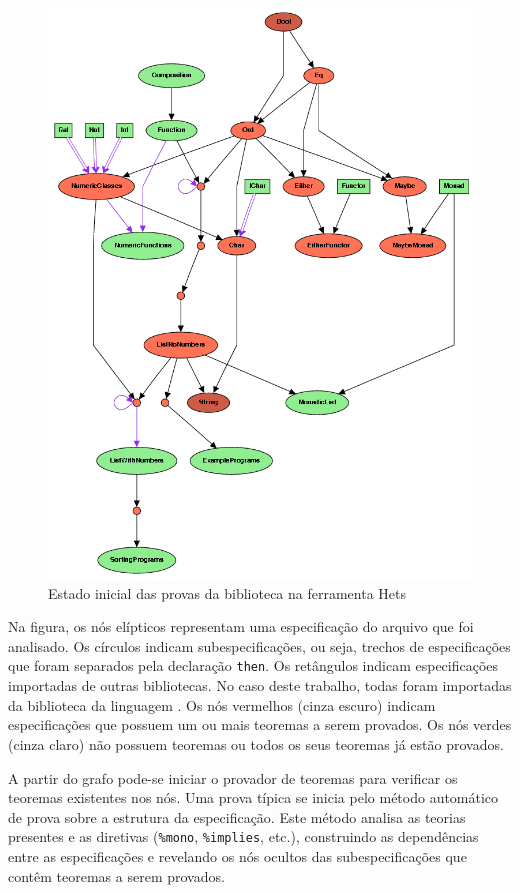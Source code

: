 \begin{figure}[hp]
    \centering
        \includegraphics[scale=0.9]{figuras/ProofStart.png}
    \caption{Estado inicial das provas da biblioteca na ferramenta Hets}
    \label{fig:ProofStart}
\end{figure}

Na figura, os nós elípticos representam uma especificação do arquivo que foi analisado.
Os círculos indicam subespecificações, ou seja, trechos de especificações que foram separados pela declaração \Verb.then..
Os retângulos indicam especificações importadas de outras bibliotecas.
No caso deste trabalho, todas foram importadas da biblioteca da linguagem \CASL.
Os nós vermelhos (cinza escuro) indicam especificações que possuem um ou mais teoremas a serem provados.
Os nós verdes (cinza claro) não possuem teoremas ou todos os seus teoremas já estão provados.

A partir do grafo pode-se iniciar o provador de teoremas \Isabelle para verificar os teoremas existentes nos nós. Uma prova típica se inicia pelo método automático de prova sobre a estrutura da especificação. Este método analisa as teorias presentes e as diretivas (\Verb.%mono., \Verb.%implies., etc.), construindo as dependências entre as especificações e revelando os nós ocultos das subespecificações que contêm teoremas a serem provados.

